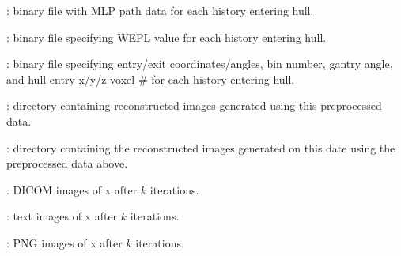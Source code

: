 \documentclass[landscape,12pt]{article}
\begin{document}
\begin{myEnumerate}[labelindent=1pt, leftmargin=*]
\begin{myEnumerate}[labelindent=1pt, leftmargin=*]
\begin{myEnumerate}[labelindent=1pt, leftmargin=*]
\begin{myEnumerate}[labelindent=1pt, leftmargin=*]
\begin{myEnumerate}[labelindent=1pt, leftmargin=*]
\begin{myEnumerate}[labelindent=1pt, leftmargin=*]
\begin{myEnumerate}[labelindent=1pt, leftmargin=*]
\begin{myEnumerate}[labelindent=1pt, leftmargin=*]
\begin{myEnumerate}[labelindent=1pt, leftmargin=*]
                                        \item {} \color{Black}: binary file with MLP path data for each history entering hull.
                                        \item {} \color{Black}: binary file specifying WEPL value for each history entering hull.
                                        \item {} \color{Black}: binary file specifying entry/exit coordinates/angles, bin number, gantry angle, and hull entry x/y/z voxel \# for each history entering hull.
                                        \item {} \color{Black}: directory containing reconstructed images generated using this preprocessed data.
                                        \begin{myEnumerate}[labelindent=1pt, leftmargin=*]
                                            \item {} \color{Black}: directory containing the reconstructed images generated on this date using the preprocessed data above.
                                                \begin{myEnumerate}[labelindent=1pt, leftmargin=*]
                                                    \item {} \color{Black}: DICOM images of x after $k$ iterations.
                                                    \item {} \color{Black}: text images of x after $k$ iterations.
                                                    \item {} \color{Black}: PNG images of x after $k$ iterations.
                                                \end{myEnumerate}
                                        \end{myEnumerate}
                                    \end{myEnumerate}
                                \end{myEnumerate}
                            \end{myEnumerate}
                        \end{myEnumerate}
                    \end{myEnumerate}

\end{myEnumerate}
\end{myEnumerate}
\end{myEnumerate}
\end{myEnumerate}
\end{document}
